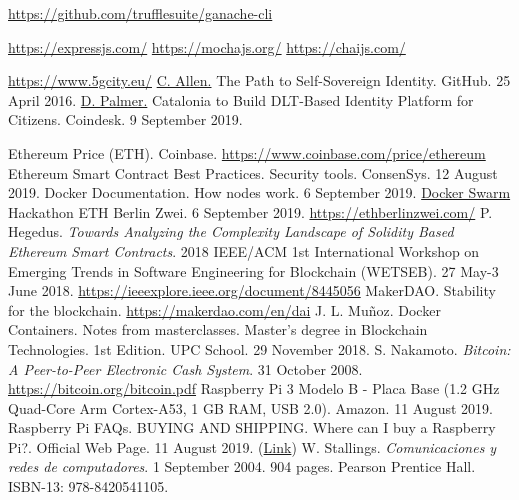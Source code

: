 \documentclass[12pt]{amsart}
\begin{document}
\begin{multicols}{2}
\begin{thebibliography}{9}
  \href{https://github.com/trufflesuite/ganache-cli}{https://github.com/trufflesuite/ganache-cli}

  \href{https://expressjs.com/}{https://expressjs.com/}
  \href{https://mochajs.org/}{https://mochajs.org/}
  \href{https://chaijs.com/}{https://chaijs.com/}

 \href{https://www.5gcity.eu/}{https://www.5gcity.eu/}
  \href{https://github.com/ChristopherA/self-sovereign-identity/blob/master/ThePathToSelf-SovereignIdentity.md}
  {C. Allen.} The Path to Self-Sovereign Identity. GitHub. 25 April 2016.
  \href{https://www.coindesk.com/catalonia-government-to-build-dlt-based-identity-platform-for-citizens}
       {D. Palmer.} Catalonia to Build DLT-Based Identity Platform for Citizens. Coindesk. 9 September 2019.


 Ethereum Price (ETH). Coinbase. \href{https://www.coinbase.com/price/ethereum}{https://www.coinbase.com/price/ethereum}
 Ethereum Smart Contract Best Practices. Security tools. ConsenSys. 12 August 2019.
 Docker Documentation. How nodes work. 6 September 2019.  \href{https://docs.docker.com/engine/swarm/how-swarm-mode-works/nodes/}{Docker Swarm}
 Hackathon ETH Berlin Zwei. 6 September 2019. \href{https://ethberlinzwei.com/}{https://ethberlinzwei.com/}
 P. Hegedus. \textit{Towards Analyzing the Complexity Landscape of Solidity Based Ethereum Smart Contracts}. 2018 IEEE/ACM 1st International Workshop on Emerging Trends in Software Engineering for Blockchain (WETSEB). 27 May-3 June 2018. \href{https://ieeexplore.ieee.org/document/8445056}{https://ieeexplore.ieee.org/document/8445056}
 MakerDAO. Stability for the blockchain.  \href{https://makerdao.com/en/dai}{https://makerdao.com/en/dai}
 J. L. Muñoz. Docker Containers. Notes from masterclasses. Master’s degree in Blockchain Technologies. 1st Edition. UPC School. 29 November 2018.
 S. Nakamoto. \textit{Bitcoin: A Peer-to-Peer Electronic Cash System}. 31 October 2008.  \href{https://bitcoin.org/bitcoin.pdf}{https://bitcoin.org/bitcoin.pdf}
 Raspberry Pi 3 Modelo B - Placa Base (1.2 GHz Quad-Core Arm Cortex-A53, 1 GB RAM, USB 2.0). Amazon. 11 August 2019.
 Raspberry Pi FAQs. BUYING AND SHIPPING. Where can I buy a Raspberry Pi?. Official Web Page. 11 August 2019.  (\href{https://www.raspberrypi.org/help/faqs/#buyingWhere}{Link})
 W. Stallings. \textit{Comunicaciones y redes de computadores}. 1 September 2004. 904 pages. Pearson Prentice Hall. ISBN-13: 978-8420541105.




\end{thebibliography}
\end{multicols}
\end{document}
